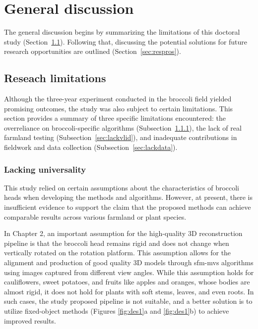 \chapter{General discussion}

The general discussion begins by summarizing the limitations of this doctoral study (Section~\ref{sec:reslim}). Following that, discussing the potential solutions for future research opportunities are outlined (Section~\ref{sec:respros}).

\section{Reseach limitations} \label{sec:reslim}


  Although the three-year experiment conducted in the broccoli field yielded promising outcomes, the study was also subject to certain limitations.
  This section provides a summary of three specific limitations encountered: 
  the overreliance on broccoli-specific algorithms (Subsection~\ref{sec:lackuni}), 
  the lack of real farmland testing (Subsection~\ref{sec:lackvlid}), 
  and inadequate contributions in fieldwork and data collection (Subsection~\ref{sec:lackdata}).


\subsection{Lacking universality} \label{sec:lackuni}


  This study relied on certain assumptions about the characteristics of broccoli heads when developing the methods and algorithms.
  However, at present, there is insufficient evidence to support the claim that the proposed methods can achieve comparable results across various farmland or plant species.

  In Chapter 2, an important assumption for the high-quality 3D reconstruction pipeline is that the broccoli head remains rigid and does not change when vertically rotated on the rotation platform. 
  This assumption allows for the alignment and production of good quality 3D models through \gls{sfm}-\gls{mvs} algorithms using images captured from different view angles. 
  While this assumption holds for cauliflowers, sweet potatoes, and fruits like apples and oranges, whose bodies are almost rigid, it does not hold for plants with soft stems, leaves, and even roots.
  In such cases, the study proposed pipeline is not suitable, and a better solution is to utilize fixed-object methods (Figures \ref{fig:des1}a and \ref{fig:des1}b) to achieve improved results.

